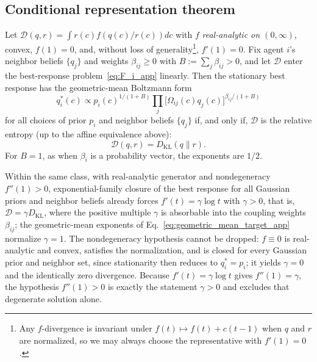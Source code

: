 \subsection*{Conditional representation theorem}

\begin{theorem}\label{thm:representation_app}
Let\/ $\mathcal{D}(q,r) = \int r(c)f(q(c)/r(c))dc$ with $f$ \emph{real-analytic on $(0, \infty)$}, convex, $f(1)=0$, and, without loss of generality\footnote{Any $f$-divergence is invariant under $f(t)\mapsto f(t)+c(t-1)$ when $q$ and $r$ are normalized, so we may always choose the representative with $f'(1)=0$.}, $f'(1)=0$. Fix agent $i$'s neighbor beliefs $\{q_j\}$ and weights $\beta_{ij} \geq 0$ with $B := \sum_j \beta_{ij} > 0$, and let $\mathcal{D}$ enter the best-response problem~\eqref{eq:F_i_app} linearly. Then the stationary best response has the geometric-mean Boltzmann form
\begin{equation}
q_i^*(c) \propto p_i(c)^{1/(1+B)}\prod_{j}\bigl[\Omega_{ij}(c)q_j(c)\bigr]^{\beta_{ij}/(1+B)}
\label{eq:geometric_mean_target_app}
\end{equation}
for all choices of prior $p_i$ and neighbor beliefs $\{q_j\}$ if, and only if, $\mathcal{D}$ is the relative entropy (up to the affine equivalence above):
\[
\mathcal{D}(q,r) = D_{\mathrm{KL}}(q\|r).
\]
For $B = 1$, as when $\beta_i$ is a probability vector, the exponents are $1/2$.
\end{theorem}

\begin{corollary}
\label{cor:closure_forces_kl}
Within the same class, with real-analytic generator and nondegeneracy $f''(1) > 0$, exponential-family closure of the best response for all Gaussian priors and neighbor beliefs already forces $f'(t) = \gamma \log t$ with $\gamma > 0$, that is, $\mathcal{D} = \gamma D_{\mathrm{KL}}$, where the positive multiple $\gamma$ is absorbable into the coupling weights $\beta_{ij}$; the geometric-mean exponents of Eq.~\eqref{eq:geometric_mean_target_app} normalize $\gamma = 1$. The nondegeneracy hypothesis cannot be dropped: $f \equiv 0$ is real-analytic and convex, satisfies the normalization, and is closed for every Gaussian prior and neighbor set, since stationarity then reduces to $q_i^* = p_i$; it yields $\gamma = 0$ and the identically zero divergence. Because $f'(t) = \gamma \log t$ gives $f''(1) = \gamma$, the hypothesis $f''(1) > 0$ is exactly the statement $\gamma > 0$ and excludes that degenerate solution alone.
\end{corollary}


